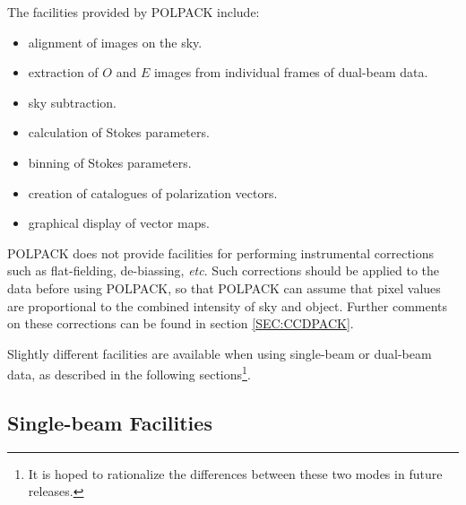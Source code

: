 \documentclass[twoside,11pt]{article}
\newcommand{\hyperref}[4]{#2\ref{#4}#3}
\renewcommand{\_}{\texttt{\symbol{95}}}
\begin{document}
The facilities provided by POLPACK include:
\begin{itemize}
\item alignment of images on the sky.
\item extraction of $O$ and $E$ images from individual frames of dual-beam
data.
\item sky subtraction.
\item calculation of Stokes parameters.
\item binning of Stokes parameters.
\item creation of catalogues of polarization vectors.
\item graphical display of vector maps.
\end{itemize}

POLPACK does not provide facilities for performing instrumental
corrections such as flat-fielding, de-biassing, \emph{etc}. Such corrections
should be applied to the data before using POLPACK, so that POLPACK can
assume that pixel values are proportional to the combined intensity of
sky and object. Further comments on these corrections can be found
\hyperref{here}{in section }{}{SEC:CCDPACK}.

Slightly different facilities are available when using single-beam or
dual-beam data, as described in the following sections\footnote{It is
hoped to rationalize the differences between these two modes in future
releases.}.

\subsection{Single-beam Facilities}
\end{document}
